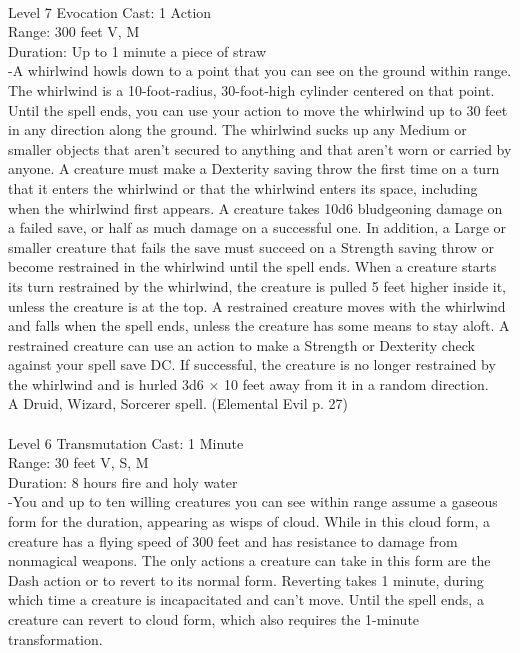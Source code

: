 \documentclass[10pt,twocolumn]{report}
\begin{document}
 \\
Level 7 \quad Evocation \quad Cast: 1 Action\\
Range: 300 feet \quad V, M\\
Duration: Up to 1 minute \quad a piece of straw\\
-A whirlwind howls down to a point that you can see on the ground within range. The whirlwind is a 10-foot-radius, 30-foot-high cylinder centered on that point. Until the spell ends, you can use your action to move the whirlwind up to 30 feet in any direction along the ground. The whirlwind sucks up any Medium or smaller objects that aren’t secured to anything and that aren’t worn or carried by anyone.
A creature must make a Dexterity saving throw the first time on a turn that it enters the
whirlwind or that the whirlwind enters its space, including when the whirlwind first appears. A creature takes 10d6 bludgeoning damage on a failed save, or half as much damage on a successful one. In addition, a Large or smaller creature that fails the save must succeed on a Strength saving throw or become restrained in the whirlwind until the spell ends. When a creature starts its turn restrained by the whirlwind, the creature is pulled 5 feet higher inside it, unless the creature is at the top.
A restrained creature moves with the whirlwind and falls when the spell ends, unless the creature has some means to stay aloft. A restrained creature can use an action to make a Strength or Dexterity check against your spell save DC. If successful, the creature is no longer restrained by the whirlwind and is hurled 3d6 × 10 feet away from it in a random direction.\\
A Druid, Wizard, Sorcerer spell. (Elemental Evil p. 27) \\


 \\
Level 6 \quad Transmutation \quad Cast: 1 Minute\\
Range: 30 feet \quad V, S, M\\
Duration: 8 hours \quad fire and holy water\\
-You and up to ten willing creatures you can see within range assume a gaseous form for the duration, appearing as wisps of cloud.
While in this cloud form, a creature has a flying speed of 300 feet and has resistance to damage from nonmagical weapons. The only actions a creature can take in this form are the Dash action or to revert to its normal form.
Reverting takes 1 minute, during which time a creature is incapacitated and can’t move. Until the spell ends, a creature can revert to cloud form, which also requires the 1-minute transformation.
\end{document}
